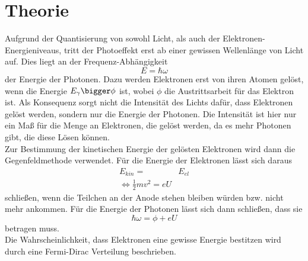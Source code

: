 \section{Theorie}
\label{sec:Theorie}

Aufgrund der Quantisierung von sowohl Licht, als auch der Elektronen-Energieniveaus, tritt der Photoeffekt
erst ab einer gewissen Wellenlänge von Licht auf. Dies liegt an der Frequenz-Abhängigkeit
\begin{equation}
    E=\hbar \omega
    \label{eqn:photon}
\end{equation}
der Energie der Photonen. Dazu werden Elektronen erst von ihren Atomen gelöst, wenn die Energie $E_\gamma \bigger \phi$
ist, wobei $\phi$ die Austrittsarbeit für das Elektron ist. Als Konsequenz sorgt nicht die Intensität des Lichts dafür,
dass Elektronen gelöst werden, sondern nur die Energie der Photonen. Die Intensität ist hier nur ein Maß für die Menge
an Elektronen, die gelöst werden, da es mehr Photonen gibt, die diese Lösen können. \\
Zur Bestimmung der kinetischen Energie der gelösten Elektronen wird dann die Gegenfeldmethode verwendet. Für die Energie 
der Elektronen lässt sich daraus
\begin{align}
    E_{kin}=&E_{el}\\
    \iff \frac{1}{2}mv^2=eU
    \label{eqn:ekin}
\end{align}
schließen, wenn die Teilchen an der Anode stehen bleiben würden bzw. nicht mehr ankommen.
Für die Energie der Photonen lässt sich dann schließen, dass sie
\begin{equation}
    \hbar \omega=\phi+eU
    \label{eqn:hquer}
\end{equation}
betragen muss. \\
Die Wahrscheinlichkeit, dass Elektronen eine gewisse Energie bestitzen wird durch eine Fermi-Dirac Verteilung beschrieben.

\cite{sample}
